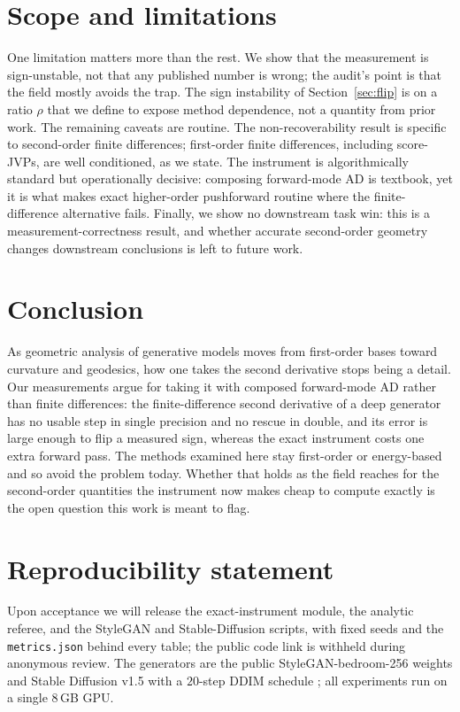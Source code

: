 \documentclass[10pt]{article} %
\begin{document}
\section{Scope and limitations}
\label{sec:scope}
One limitation matters more than the rest. We show that the measurement is
sign-unstable,
not that any published number is wrong; the audit's point is that the field
mostly avoids the trap. The sign instability of Section~\ref{sec:flip} is on a ratio
$\rho$ that we define to expose method dependence, not a quantity from prior work.
The remaining caveats are routine. The non-recoverability result is specific to
second-order finite differences; first-order finite differences, including
score-JVPs, are well conditioned, as we state. The instrument is algorithmically
standard but operationally decisive: composing forward-mode AD is textbook, yet it
is what makes exact higher-order pushforward routine where the finite-difference
alternative fails. Finally, we show no downstream task win: this
is a measurement-correctness result, and whether accurate second-order geometry
changes downstream conclusions is left to future work.

\section{Conclusion}
As geometric analysis of generative models moves from first-order bases toward
curvature and geodesics, how one takes the second derivative stops being a detail.
Our measurements argue for taking it with composed forward-mode AD rather than
finite differences: the finite-difference second derivative of a deep generator
has no usable step in single precision and no rescue in double, and its error is
large enough to flip a measured sign, whereas the exact instrument costs one extra
forward pass. The methods examined here stay first-order or energy-based and so
avoid the problem today. Whether that holds as the field reaches for the
second-order quantities the instrument now makes cheap to compute exactly is the
open question this work is meant to flag.

\section*{Reproducibility statement}
Upon acceptance we will release the exact-instrument module, the analytic referee,
and the StyleGAN and Stable-Diffusion scripts, with fixed seeds and the
\texttt{metrics.json} behind every table; the public code link is withheld during
anonymous review. The generators are the public StyleGAN-bedroom-256 weights
\citep{karras2019} and Stable Diffusion v1.5 \citep{rombach2022} with a $20$-step
DDIM schedule \citep{song2021ddim}; all experiments run on a single 8\,GB GPU.
\end{document}
